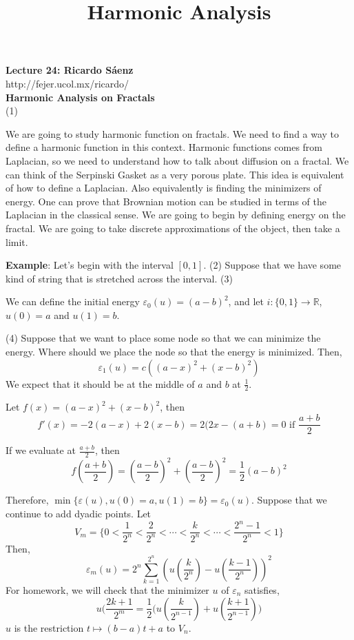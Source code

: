 \documentclass[12pt]{article}
\title{Harmonic Analysis}
\begin{document}
\noindent \textbf{Lecture 24: Ricardo S\'aenz} \\
\noindent http://fejer.ucol.mx/ricardo/ \\

\noindent \textbf{Harmonic Analysis on Fractals } \\
(1)

\noindent We are going to study harmonic function on fractals. We need to find a way to define a harmonic function in this context. Harmonic functions comes from Laplacian, so we need to understand how to talk about diffusion on a fractal. We can think of the Serpinski Gasket as a very porous plate. This idea is equivalent of how to define a Laplacian. Also equivalently is finding the minimizers of energy. One can prove that Brownian motion can be studied in terms of the Laplacian in the classical sense. We are going to begin by defining energy on the fractal. We are going to take discrete approximations of the object, then take a limit. 


\noindent \textbf{Example}: Let's begin with the interval $[0,1]$. 
(2)
Suppose that we have some kind of string that is stretched across the interval.
(3)

We can define the initial energy $\varepsilon_0(u) = (a-b)^2$, and let $i:\{0,1\} \rightarrow \mathbb{R}$, $u(0)=a$ and $u(1)=b$. 

(4)
Suppose that we want to place some node so that we can minimize the energy. Where should we place the node so that the energy is minimized. Then, 
$$\varepsilon_1(u) = c((a-x)^2 + (x-b)^2)$$
We expect that it should be at the middle of $a$ and $b$ at $\frac{1}{2}$. 

Let $f(x)= (a-x)^2+ (x-b)^2$, then
$$f'(x) = -2(a-x) + 2(x-b) = 2(2x-(a+b)=0 \text{ if } \frac{a+b}{2}$$

If we evaluate at $\frac{a+b}{2}$, then
$$f(\frac{a+b}{2}) = (\frac{a-b}{2})^2 + (\frac{a-b}{2})^2 = \frac{1}{2} (a-b)^2$$

Therefore, $\min \{\varepsilon(u), u(0)=a, u(1)=b\} = \varepsilon_0(u)$. Suppose that we continue to add dyadic points. Let 
$$V_m = \{ 0 < \frac{1}{2^n} < \frac{2}{2^n} < \cdots < \frac{k}{2^n} < \cdots < \frac{2^n-1}{2^n} < 1\}$$
Then, 
$$\varepsilon_m(u) = 2^n\sum^{2^n}_{k=1}(u(\frac{k}{2^n}) - u(\frac{k-1}{2^n}))^2$$
For homework, we will check that the minimizer $u$ of $\varepsilon_n$ satisfies, 
$$u(\frac{2k+1}{2^m} = \frac{1}{2}\Big(u(\frac{k}{2^{n-1}}) + u (\frac{k+1}{2^{n-1}})\Big)$$
$u$ is the restriction $t \mapsto (b-a)t + a$ to $V_n$. 
\end{document}
